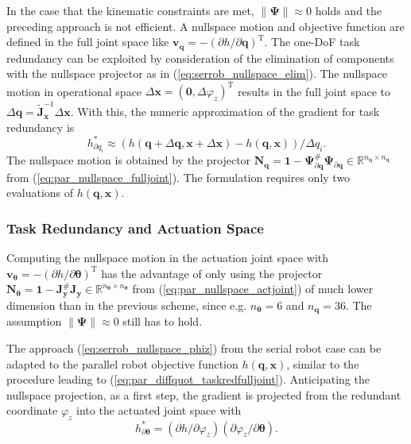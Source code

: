 \documentclass[a4paper,twoside]{article}
\newcommand{\transp}[0]{{\mathrm{T}}}
\begin{document}
In the case that the kinematic constraints are met, $\lVert\bm{\Psi}\rVert \approx 0$ holds and the preceding approach is not efficient.
A nullspace motion and objective function are defined in the full joint space like $\bm{v}_{\bm{q}} = -(\partial h / \partial \bm{q})^\transp$.
The one-DoF task redundancy can be exploited by consideration of the elimination of components with the nullspace projector as in (\ref{eq:serrob_nullspace_elim}).
The nullspace motion in operational space $\Delta \bm{x}=(\bm{0},\Delta  \varphi_z)^\transp$ results in the full joint space to $\Delta \bm{q}=\tilde{\bm{J}}^{-1}_{\bm{x}} \Delta \bm{x}$.
With this, the numeric approximation of the gradient for task redundancy is
\begin{equation}
h_{\partial q_i}^{*} \approx (h(\bm{q}+\Delta \bm{q},\bm{x}+\Delta \bm{x}) - h(\bm{q},\bm{x}))/\Delta q_i.
\label{eq:par_diffquot_taskredfulljoint}
\end{equation}
The nullspace motion is obtained by the projector $\bm{N}_{\bm{q}} = \bm{1}-\bm{\Psi}_{\partial \bm{q}}^{\#}\bm{\Psi}_{\partial \bm{q}} \in \mathbb{R}^{n_{\bm{q}} \times n_{\bm{q}}}$ from (\ref{eq:par_nullspace_fulljoint}).
The formulation requires only two evaluations of $h(\bm{q},\bm{x})$. %

\subsubsection{Task Redundancy and Actuation Space}
\label{sec:parrob_taskred_actspace}

Computing the nullspace motion in the actuation joint space with $\bm{v}_{\bm{\theta}} = -(\partial h / \partial \bm{\theta})^\transp$ has the advantage of only using the projector $\bm{N}_{\bm{\theta}} = \bm{1}-\bm{J}_{\bm{y}}^{\#}\bm{J}_{\bm{y}} \in \mathbb{R}^{n_{\bm{\theta}} \times n_{\bm{\theta}}}$ from (\ref{eq:par_nullspace_actjoint}) of much lower dimension than in the previous scheme, since e.g. $n_{\bm{\theta}}{=}6$ and $n_{\bm{q}}{=}36$.
The assumption $\lVert\bm{\Psi}\rVert \approx 0$ still has to hold.

The approach (\ref{eq:serrob_nullspace_phiz}) from the serial robot case can be adapted to the parallel robot objective function $h(\bm{q},\bm{x})$, similar to the procedure leading to (\ref{eq:par_diffquot_taskredfulljoint}).
Anticipating the nullspace projection, as a first step, the gradient is projected from the redundant coordinate $\varphi_z$ into the actuated joint space with
\begin{equation}
h_{\partial \bm{\theta}}^{*} = (\partial h / \partial \varphi_z) (\partial \varphi_z / \partial \bm{\theta}).
\label{eq:par_nullspace_actspace}
\end{equation}
\end{document}
